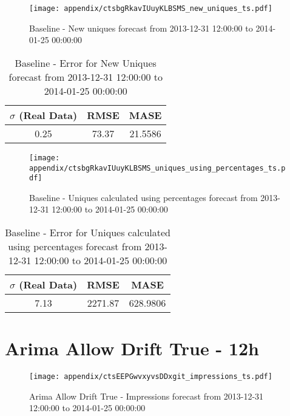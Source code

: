 \begin{figure}[H] \begin{center} \leavevmode
\texttt{[image: appendix/ctsbgRkavIUuyKLBSMS\_new\_uniques\_ts.pdf]} \caption{
Baseline - New uniques forecast from 2013-12-31 12:00:00 to 2014-01-25 00:00:00} \label{fig:appendix/ctsbgRkavIUuyKLBSMS_new_uniques_ts.pdf} \end{center}
\end{figure}

\begin{table}[H]
\centering
\footnotesize
\begin{tabular}{ccc}
$\sigma$ (Real Data) & RMSE & MASE   \\ \hline
0.25 & 73.37 & 21.5586 \\
\end{tabular}

\vspace{0.5cm}

\caption{
Baseline - Error for New Uniques forecast from 2013-12-31 12:00:00 to 2014-01-25 00:00:00}
\end{table}

\begin{figure}[H] \begin{center} \leavevmode
\texttt{[image: appendix/ctsbgRkavIUuyKLBSMS\_uniques\_using\_percentages\_ts.pdf]} \caption{
Baseline - Uniques calculated using percentages forecast from 2013-12-31 12:00:00 to 2014-01-25 00:00:00} \label{fig:appendix/ctsbgRkavIUuyKLBSMS_uniques_using_percentages_ts.pdf} \end{center}
\end{figure}

\begin{table}[H]
\centering
\footnotesize
\begin{tabular}{ccc}
$\sigma$ (Real Data) & RMSE & MASE   \\ \hline
7.13 & 2271.87 & 628.9806 \\
\end{tabular}

\vspace{0.5cm}

\caption{
Baseline - Error for Uniques calculated using percentages forecast from 2013-12-31 12:00:00 to 2014-01-25 00:00:00}
\end{table}

\section{Arima Allow Drift True - 12h}
\begin{figure}[H] \begin{center} \leavevmode
\texttt{[image: appendix/ctsEEPGwvxyvsDDxgit\_impressions\_ts.pdf]} \caption{
Arima Allow Drift True - Impressions forecast from 2013-12-31 12:00:00 to 2014-01-25 00:00:00} \label{fig:appendix/ctsEEPGwvxyvsDDxgit_impressions_ts.pdf} \end{center}
\end{figure}

